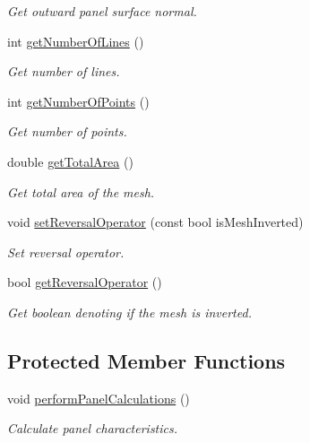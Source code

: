 \begin{DoxyCompactItemize}
\begin{DoxyCompactList}\small\item\em Get outward panel surface normal. \end{DoxyCompactList}\item 
int \hyperlink{classtudat_1_1geometric__shapes_1_1QuadrilateralMeshedSurfaceGeometry_ad70047cbce7abca955b2fe67fde9b911}{get\+Number\+Of\+Lines} ()
\begin{DoxyCompactList}\small\item\em Get number of lines. \end{DoxyCompactList}\item 
int \hyperlink{classtudat_1_1geometric__shapes_1_1QuadrilateralMeshedSurfaceGeometry_a1f04acd06c7e81d3cbfa745248ccbc93}{get\+Number\+Of\+Points} ()
\begin{DoxyCompactList}\small\item\em Get number of points. \end{DoxyCompactList}\item 
double \hyperlink{classtudat_1_1geometric__shapes_1_1QuadrilateralMeshedSurfaceGeometry_a40114785d7836b099bf0e99374205cc7}{get\+Total\+Area} ()
\begin{DoxyCompactList}\small\item\em Get total area of the mesh. \end{DoxyCompactList}\item 
void \hyperlink{classtudat_1_1geometric__shapes_1_1QuadrilateralMeshedSurfaceGeometry_a6061bf3b165f5aa1fe9dd0678da3ab2f}{set\+Reversal\+Operator} (const bool is\+Mesh\+Inverted)
\begin{DoxyCompactList}\small\item\em Set reversal operator. \end{DoxyCompactList}\item 
bool \hyperlink{classtudat_1_1geometric__shapes_1_1QuadrilateralMeshedSurfaceGeometry_aa780bc0a12d1936cde32809c44e697a7}{get\+Reversal\+Operator} ()
\begin{DoxyCompactList}\small\item\em Get boolean denoting if the mesh is inverted. \end{DoxyCompactList}\end{DoxyCompactItemize}
\subsection*{Protected Member Functions}
\begin{DoxyCompactItemize}
\item 
void \hyperlink{classtudat_1_1geometric__shapes_1_1QuadrilateralMeshedSurfaceGeometry_a76af62d5ebe8603a4712b5992ae30a90}{perform\+Panel\+Calculations} ()
\begin{DoxyCompactList}\small\item\em Calculate panel characteristics. \end{DoxyCompactList}\end{DoxyCompactItemize}
